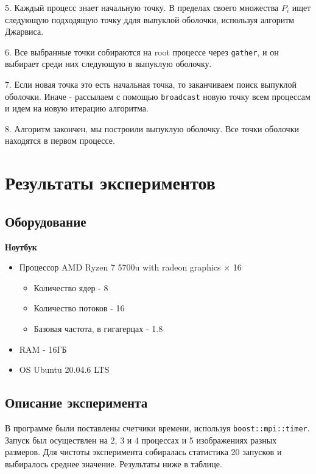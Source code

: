 \documentclass[a4paper, 12pt]{article}
\begin{document}
5. Каждый процесс знает начальную точку. В пределах своего множества $P_i$ ищет следующую подходящую точку ддля выпуклой оболочки, используя алгоритм Джарвиса.

6. Все выбранные точки собираются на root процессе через \texttt{gather}, и он выбирает среди них следующую в выпуклую оболочку.

7. Если новая точка это есть начальная точка, то заканчиваем поиск выпуклой оболочки. Иначе - рассылаем с помощью \texttt{broadcast} новую точку всем процессам и идем на новую итерацию алгоритма.

8. Алгоритм закончен, мы построили выпуклую оболочку. Все точки оболочки находятся в первом процессе.


\newpage
\newpage
\section{Результаты экспериментов}
\subsection{Оборудование}


\textbf{Ноутбук}
\begin{itemize}
    \item Процессор AMD Ryzen 7 5700u with radeon graphics × 16
    \begin{itemize}
        \item  Количество ядер - 8
        \item  Количество потоков - 16
        \item  Базовая частота, в гигагерцах - 1.8
    \end{itemize}
    \item RAM - 16ГБ
    \item OS Ubuntu 20.04.6 LTS
\end{itemize}

\begin{center}
    \subsection{Описание эксперимента}
\end{center}

В программе были поставлены счетчики времени, используя \texttt{boost::mpi::timer}. Запуск был осуществлен на 2, 3 и 4 процессах и 5 изображениях разных размеров. Для чистоты эксперимента собиралась статистика 20 запусков и выбиралось среднее значение. Результаты ниже в таблице.\\[2mm]
\end{document}
